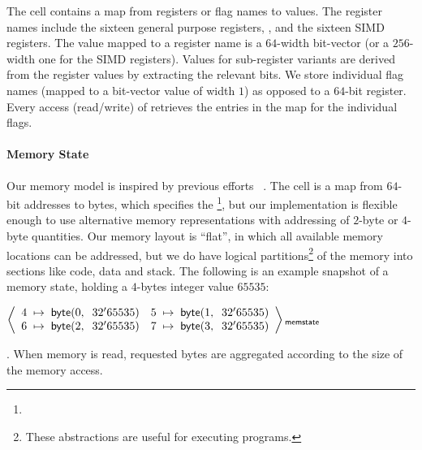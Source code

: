 The  cell contains a  map from registers or flag names to values.  The register names include the sixteen general purpose registers, , and the sixteen SIMD registers.  The value mapped to a register name is a $64$-width bit-vector (or a $256$-width one for the SIMD registers). Values for sub-register variants are derived from the register values by extracting the relevant bits. We store individual flag names (mapped to a bit-vector value of width $1$) as opposed to a $64$-bit  register. Every access (read/write) of  retrieves the entries in the  map for the individual flags.

\paragraph{Memory State}
Our memory model is inspired by previous efforts ~\cite{TSL:TOPLAS13, Ellison}.
The  cell is a map from $64$-bit addresses to bytes, which specifies the \footnote{}, but our implementation is flexible enough to use alternative memory  representations with addressing of $2$-byte or $4$-byte quantities.  Our memory layout is ``flat'', in which all available memory locations can be addressed, but we do have logical partitions\footnote{These abstractions are useful for executing \ISA programs.} of the memory into sections like code, data and stack.  The following is an example snapshot of a memory state,  holding a $4$-bytes integer value $65535$:
\begin{tightcenter}
    \small
    \newcommand{\bytecell}[2]{\s{byte}({#1},\;\;{#2})}
    $
    \kall{memstate} {
        \begin{array}{c}
        4 \;\mapsto\;  \bytecell{0}{32'65535} \quad
        5 \;\mapsto\;  \bytecell{1}{32'65535}\\
        6 \;\mapsto\;  \bytecell{2}{32'65535} \quad
        7 \;\mapsto\;  \bytecell{3}{32'65535}\\
        \end{array}
    }
    $
\end{tightcenter}
. When memory is read, requested bytes are aggregated according to the size of the memory access.



